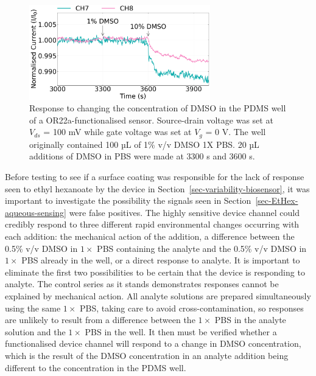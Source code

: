\documentclass[
  a4paper,
]{scrbook}
\begin{document}
\begin{figure}

{\centering \includegraphics[width=0.7\textwidth,height=\textheight]{figures/ch8/NGW4_D7_OR22aliposome_sampling_220623_detrend_trunc_arrows_normalised.png}

}

\caption{\label{fig-DMSO-concentration}Response to changing the
concentration of DMSO in the PDMS well of a OR22a-functionalised sensor.
Source-drain voltage was set at \(V_{ds}\) = 100 mV while gate voltage
was set at \(V_g\) = 0 V. The well originally contained 100 µL of 1\%
v/v DMSO 1X PBS. 20 µL additions of DMSO in PBS were made at 3300 s and
3600 s.}

\end{figure}

Before testing to see if a surface coating was responsible for the lack
of response seen to ethyl hexanoate by the device in
Section~\ref{sec-variability-biosensor}, it was important to investigate
the possibility the signals seen in
Section~\ref{sec-EtHex-aqueous-sensing} were false positives. The highly
sensitive device channel could credibly respond to three different rapid
environmental changes occurring with each addition: the mechanical
action of the addition, a difference between the 0.5\% v/v DMSO in
\(1 \times\) PBS containing the analyte and the 0.5\% v/v DMSO in
\(1 \times\) PBS already in the well, or a direct response to analyte.
It is important to eliminate the first two possibilities to be certain
that the device is responding to analyte. The control series as it
stands demonstrates responses cannot be explained by mechanical action.
All analyte solutions are prepared simultaneously using the same
\(1 \times\) PBS, taking care to avoid cross-contamination, so responses
are unlikely to result from a difference between the \(1 \times\) PBS in
the analyte solution and the \(1 \times\) PBS in the well. It then must
be verified whether a functionalised device channel will respond to a
change in DMSO concentration, which is the result of the DMSO
concentration in an analyte addition being different to the
concentration in the PDMS well.
\end{document}

